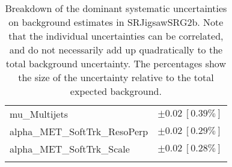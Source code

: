 \begin{table}
\begin{center}
\begin{tabular*}{\textwidth}{@{\extracolsep{\fill}}lc}
mu\_Multijets         & $\pm 0.02\ [0.39\%] $       \\
alpha\_MET\_SoftTrk\_ResoPerp         & $\pm 0.02\ [0.29\%] $       \\
alpha\_MET\_SoftTrk\_Scale         & $\pm 0.02\ [0.28\%] $       \\
\noalign{\smallskip}\hline\noalign{\smallskip}
\end{tabular*}
\end{center}
\caption[Breakdown of uncertainty on background estimates]{
Breakdown of the dominant systematic uncertainties on background estimates in SRJigsawSRG2b.
Note that the individual uncertainties can be correlated, and do not necessarily add up quadratically to 
the total background uncertainty. The percentages show the size of the uncertainty relative to the total expected background.
\label{table.results.bkgestimate.uncertainties.SRJigsawSRG2b}}
\end{table}
%